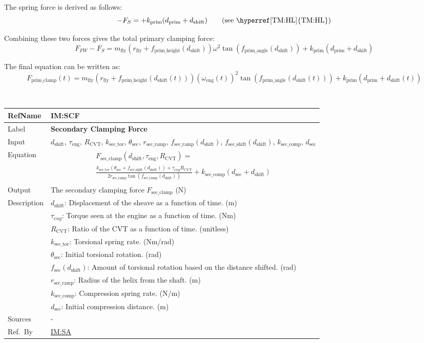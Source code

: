 \documentclass[12pt]{article}
\newcommand{\colAwidth}{0.13\textwidth}
\newcommand{\colBwidth}{0.82\textwidth}
\newcommand{\hpref}[1]{\hyperref[#1]{#1}}
\newcommand{\definstance}[8] {
~\newline
\noindent
\begin{minipage}{\textwidth}
\renewcommand*{\arraystretch}{1.5}
\begin{tabular}{| p{\colAwidth} | p{\colBwidth}|}
  \hline
  \rowcolor[gray]{0.9}
  RefName& \textbf{#1} \label{#1}\\
  \hline
  Label& \bf #2 \\
  \hline
  Input& #3\\
  \hline
  Equation& #4\\
  \hline
  Output& #5\\
  \hline
  Description& #6 \\
  \hline
  Sources& #7 \\
  \hline
  Ref.\ By & #8\\
  \hline
\end{tabular}
\end{minipage}\\
}
\begin{document}
The spring force is derived as follows: 
\[
-F_S = + k_{\text{prim}} (d_{\text{prim}} + d_{\text{shift}}) \tag*{\text{(see \hyperref[TM:HL]{TM:HL})}}
\]

Combining these two forces gives the total primary clamping force:
\[
F_{FW} - F_S =  m_\text{fly} (r_{\text{fly}} + f_{\text{prim\_height}}(d_{\text{shift}}))\omega^2 \tan(f_{\text{prim\_angle}}(d_{\text{shift}})) + k_{\text{prim}} (d_{\text{prim}} + d_{\text{shift}})
\]

The final equation can be written as:
\[
F_{\text{prim\_clamp}}(t) = m_\text{fly} (r_{\text{fly}} + f_{\text{prim\_height}}({d_\text{shift}(t)}))(\omega_\text{eng}(t))^2 \tan(f_{\text{prim\_angle}}(d_\text{shift}(t))) + k_{\text{prim}} (d_{\text{prim}} + d_\text{shift}(t))
\]

\definstance
{IM:SCF}
{Secondary Clamping Force}
{$d_\text{shift}$, $\tau_\text{eng}$, $R_{\text{CVT}}$, $k_{\text{sec\_tor}}$, $\theta_{\text{sec}}$, $r_{\text{sec\_ramp}}$, $f_{\text{sec\_ramp}}(d_{\text{shift}})$, $f_{\text{sec\_shift}}(d_{\text{shift}})$, $k_{\text{sec\_comp}}$, $d_{\text{sec}}$} %
{
  \begin{multline*}
    F_{\text{sec\_clamp}}(d_\text{shift}, \tau_\text{eng}, R_{\text{CVT}}) = \\
  \frac{k_{\text{sec\_tor}} (\theta_{\text{sec}} + f_{\text{sec\_shift}}(d_\text{shift})) + \tau_{eng} R_{\text{CVT}}}{2 r_{\text{sec\_ramp}} \tan(f_{\text{sec\_ramp}}(d_{\text{shift}}))} + k_{\text{sec\_comp}} (d_{\text{sec}} + d_{\text{shift}})
  \end{multline*}
} %
{The secondary clamping force $F_{\text{sec\_clamp}}$ (N)} %
{
  $d_{\text{shift}}$: Displacement of the sheave as a function of time. (m)\\
  &$\tau_{eng}$: Torque seen at the engine as a function of time. (Nm) \\
  &$R_{\text{CVT}}$: Ratio of the CVT as a function of time. (unitless) \\
  &$k_{\text{sec\_tor}}$: Torsional spring rate. (Nm/rad)\\
  &$\theta_{\text{sec}}$: Initial torsional rotation. (rad)\\
  &$f_{\text{sec}}(d_{\text{shift}})$: Amount of torsional rotation based on the distance shifted. (rad) \\
  &$r_{\text{sec\_ramp}}$: Radius of the helix from the shaft. (m)\\
  &$k_{\text{sec\_comp}}$: Compression spring rate. (N/m)\\
  &$d_{\text{sec}}$: Initial compression distance. (m)
} %
{-} %
{\hpref{IM:SA}}
\end{document}

